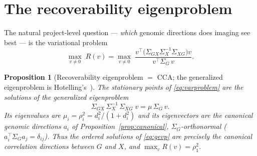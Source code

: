 \documentclass{article}
\newtheorem{proposition}{Proposition}
\newcommand{\Sg}{\Sigma_{G}}
\newcommand{\Sx}{\Sigma_{X}}
\newcommand{\Sgx}{\Sigma_{GX}}
\newcommand{\Sxg}{\Sigma_{XG}}
\newcommand{\T}{^{\top}}
\begin{document}
\section{The recoverability eigenproblem}
\label{sec:eigenproblem}

The natural project-level question --- \emph{which} genomic directions does
imaging see best --- is the variational problem
\begin{equation}
\max_{v \neq 0}\;
R(v)
= \max_{v \neq 0}\;
\frac{v\T \big(\Sgx \Sx^{-1} \Sxg\big) v}{v\T \Sg\, v}.
\label{eq:varproblem}
\end{equation}

\begin{proposition}[Recoverability eigenproblem $=$ CCA; the generalized eigenproblem is Hotelling's~\citealp{hotelling1936cca}]
\label{prop:eig}
The stationary points of \eqref{eq:varproblem} are the solutions of the
generalized eigenproblem
\begin{equation}
\Sgx\, \Sx^{-1}\, \Sxg\; v = \mu\, \Sg\, v .
\label{eq:gevp}
\end{equation}
Its eigenvalues are $\mu_i = \rho_i^2 = d_i^2/(1+d_i^2)$ and its eigenvectors are
the canonical genomic directions $a_i$ of Proposition~\ref{prop:canonical},
$\Sg$-orthonormal ($a_i\T \Sg a_j = \delta_{ij}$). Thus the ordered solutions of
\eqref{eq:gevp} are precisely the canonical correlation directions between $G$
and $X$, and $\max_v R(v) = \rho_1^2$.
\end{proposition}
\end{document}
